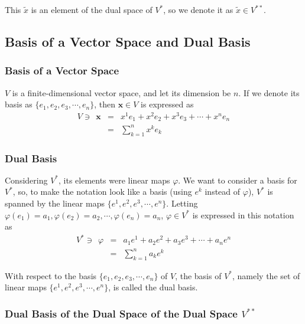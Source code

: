 \documentclass[uplatex,a4j,12pt,dvipdfmx]{jsarticle}
\begin{document}
This $\tilde{x}$ is an element of the dual space of $V^{*}$, so we denote it as $\tilde{x} \in V^{**}$.


\subsection{Basis of a Vector Space and Dual Basis}

\subsubsection{Basis of a Vector Space}

$V$ is a finite-dimensional vector space, and let its dimension be $n$.
If we denote its basis as $\{ e_{1}, e_{2}, e_{3}, \cdots , e_{n} \}$,
then $\mathbf{x} \in V$ is expressed as
\[
	\begin{array}{rcl}
		V \ni \ \
		\mathbf{x}
		 & = &
		x^{1} e_{1} + x^{2} e_{2} + x^{3} e_{3} + \cdots + x^{n} e_{n}
		\\
		 & = &
		\displaystyle \sum_{k=1}^{n} x^{k} e_{k}
	\end{array}
\]

\subsubsection{Dual Basis}

Considering $V^{*}$, its elements were linear maps $\varphi$.
We want to consider a basis for $V^{*}$, so, to make the notation look like a basis (using $e^{k}$ instead of $\varphi$),
$V^{*}$ is spanned by the linear maps $\{ e^{1}, e^{2}, e^{3}, \cdots , e^{n} \}$.
Letting $\varphi(e_{1}) = a_{1}, \varphi(e_{2}) = a_{2}, \cdots ,\varphi(e_{n}) = a_{n}$,
$\varphi \in V^{*}$ is expressed in this notation as
\[
	\begin{array}{rcl}
		V^{*} \ni \ \ \varphi
		 & = &
		a_{1} e^{1} + a_{2} e^{2} + a_{3} e^{3} + \cdots + a_{n} e^{n}
		\\
		 & = &
		\displaystyle \sum_{k=1}^{n} a_{k} e^{k}
	\end{array}
\]

With respect to the basis
$\{ e_{1}, e_{2}, e_{3}, \cdots , e_{n} \}$
of $V$,
the basis of $V^{*}$,
namely the set of linear maps
$\{ e^{1}, e^{2}, e^{3}, \cdots , e^{n} \}$,
is called the dual basis.

\subsubsection{Dual Basis of the Dual Space of the Dual Space $V^{**}$}
\end{document}
